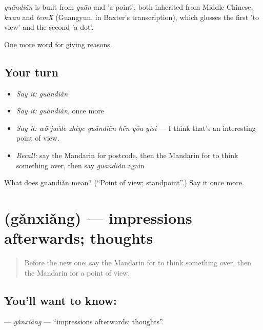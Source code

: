\begin{cousinweb}
\emph{guāndiǎn} is built from \emph{guān} and  'a point', both inherited from Middle Chinese, \emph{kwan} and \emph{temX} (Guangyun, in Baxter's transcription), which glosses the first 'to view' and the second 'a dot'.
\end{cousinweb}

\begin{grammarlens}[title={What you've built}]
One more word for giving reasons.
\end{grammarlens}

\subsection*{Your turn}
\begin{itemize}
\raggedright
  \item \emph{Say it:} \emph{guāndiǎn}
  \item \emph{Say it:} \emph{guāndiǎn}, once more
  \item \emph{Say it:} \emph{wǒ juéde zhège guāndiǎn hěn yǒu yìsi} — I think that's an interesting point of view.
  \item \emph{Recall:} say the Mandarin for postcode, then the Mandarin for to think something over, then say \emph{guāndiǎn} again
\end{itemize}

\begin{tcolorbox}[breakable,colback=teal!4,colframe=teal!35!black,title={Before you move on}]
What does guāndiǎn mean? (\textquotedblleft{}Point of view; standpoint\textquotedblright{}.) Say it once more.
\end{tcolorbox}
\section[\texorpdfstring{\zh{感想} (gǎnxiǎng)}{感想 (gǎnxiǎng)}]{ (gǎnxiǎng) — impressions afterwards; thoughts}

\label{lesson:ZH-C346-ganxiang}



\begin{quote}
Before the new one: say the Mandarin for to think something over, then the Mandarin for a point of view.
\end{quote}

\subsection*{You'll want to know: }
\textbf{} — \emph{gǎnxiǎng} — \textquotedblleft{}impressions afterwards; thoughts\textquotedblright{}.

